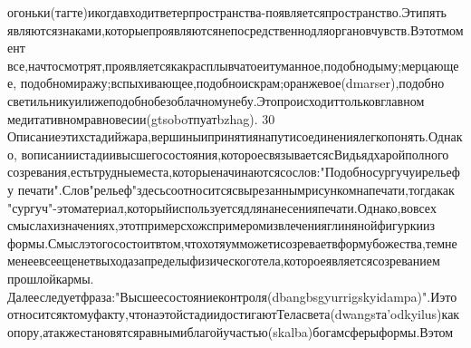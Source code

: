 огоньки(тагте)икогдавходитветерпространства-появляетсяпространство.Этипять
являютсязнаками,которыепроявляютсянепосредственнодляоргановчувств.Вэтотмомент
все,начтосмотрят,проявляетсякакрасплывчатоеитуманное,подобнодыму;мерцающее,
подобномиражу;вспыхивающее,подобноискрам;оранжевое(dmarser),подобно
светильникуилижеподобнобезоблачномунебу.Этопроисходиттольковглавном
медитативномравновесии(gtsoboтпуатbzhag).
30
Описаниеэтихстадийжара,вершиныипринятиянапутисоединениялегкопонять.Однако,
вописаниистадиивысшегосостояния,котороесвязываетсясВидьядхаройполного
созревания,естьтрудныеместа,которыеначинаютсясослов:"Подобносургучуирельефу
печати".Слов"рельеф"здесьсоотноситсясвырезаннымрисункомнапечати,тогдакак
"сургуч"-этоматериал,которыйиспользуетсядлянанесенияпечати.Однако,вовсех
смыслахизначениях,этотпримерсхожспримеромизвлеченияглинянойфигуркииз
формы.Смыслэтогосостоитвтом,чтохотяумможетисозреваетвформубожества,темне
менеевсеещенетвыходазапределыфизическоготела,котороеявляетсясозреванием
прошлойкармы.
Далееследуетфраза:"Высшеесостояниеконтроля(dbangbsgyurrigskyidampa)".Иэто
относитсяктомуфакту,чтонаэтойстадиидостигаютТеласвета(dwangsта'odkyilus)как
опору,атакжестановятсяравнымиблагойучастью(skalba)богамсферыформы.Вэтом

